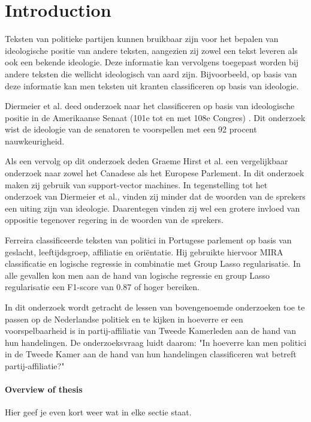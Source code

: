 \section{Introduction}
\label{sec:intro}
Teksten van politieke partijen kunnen bruikbaar zijn voor het bepalen van ideologische positie van andere teksten, aangezien zij zowel een tekst leveren als ook een bekende ideologie. Deze informatie kan vervolgens toegepast worden bij andere teksten die wellicht ideologisch van aard zijn. Bijvoorbeeld, op basis van deze informatie kan men teksten uit kranten classificeren op basis van ideologie.\par
Diermeier et al. deed onderzoek naar het classificeren op basis van ideologische positie in de Amerikaanse Senaat (101e tot en met 108e Congres) \cite{diermeier_godbout_yu_kaufmann_2012}. Dit onderzoek wist de ideologie van de senatoren te voorspellen met een 92 procent nauwkeurigheid.\par
Als een vervolg op dit onderzoek deden Graeme Hirst et al. een vergelijkbaar onderzoek naar zowel het Canadese als het Europese Parlement\cite{Hirst_textto}. In dit onderzoek maken zij gebruik van support-vector machines. In tegenstelling tot het onderzoek van Diermeier et al., vinden zij minder dat de woorden van de sprekers een uiting zijn van ideologie. Daarentegen vinden zij wel een grotere invloed van oppositie tegenover regering in de woorden van de sprekers.\par
Ferreira classificeerde teksten van politici in Portugese parlement op basis van geslacht, leeftijdsgroep, affiliatie en oriëntatie\cite{Ferreira2016UsingTT}. Hij gebruikte hiervoor MIRA classificatie en logische regressie in combinatie met Group Lasso regularisatie. In alle gevallen kon men aan de hand van logische regressie en group Lasso regularisatie een F1-score van 0.87 of hoger bereiken.\par
In dit onderzoek wordt getracht de lessen van bovengenoemde onderzoeken toe te passen op de Nederlandse politiek en te kijken in hoeverre er een voorspelbaarheid is in partij-affiliatie van Tweede Kamerleden aan de hand van hun handelingen. De onderzoeksvraag luidt daarom: "In hoeverre kan men politici in de Tweede Kamer aan de hand van hun handelingen classificeren wat betreft partij-affiliatie?"


\paragraph{Overview of thesis}
Hier geef je even kort weer wat in elke sectie staat.
